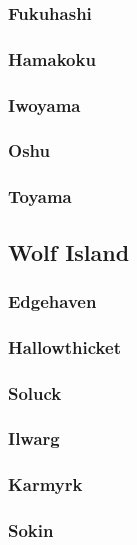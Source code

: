		\subsubsection{Fukuhashi}

		\subsubsection{Hamakoku}

		\subsubsection{Iwoyama}

		\subsubsection{Oshu}

		\subsubsection{Toyama}

	\subsection{Wolf Island}

		\subsubsection{Edgehaven}

		\subsubsection{Hallowthicket}

		\subsubsection{Soluck}

		\subsubsection{Ilwarg}

		\subsubsection{Karmyrk}

		\subsubsection{Sokin}


